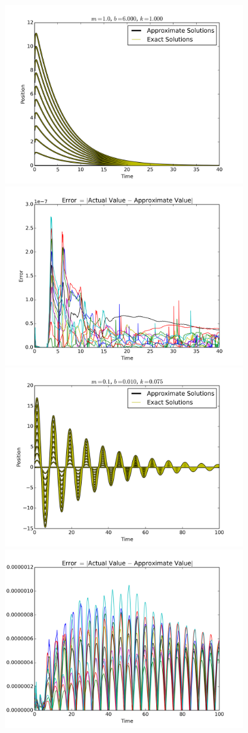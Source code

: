 \documentclass[12pt]{article}
\begin{document}
\begin{center}
	\includegraphics[width=400px]{figures/2_b_decay_1.png}
	\includegraphics[width=400px]{figures/2_b_decay_2.png}
	\includegraphics[width=400px]{figures/2_b_oscillation_1.png}
	\includegraphics[width=400px]{figures/2_b_oscillation_2.png}

\end{center}
\end{document}
